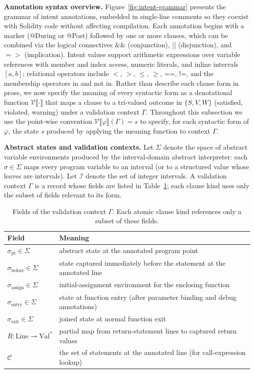 \documentclass[pdflatex,sn-basic]{sn-jnl}%
\theoremstyle{thmstyleone}%
\theoremstyle{thmstyletwo}%
\theoremstyle{thmstylethree}%
\begin{document}
\smallskip
\noindent\textbf{Annotation syntax overview.}
Figure~\ref{fig:intent-grammar} presents the grammar of intent annotations, embedded in single-line comments so they coexist with Solidity code without affecting compilation.
Each annotation begins with a marker (@During or @Post) followed by one or more clauses, which can be combined via the logical connectives \&\& (conjunction), || (disjunction), and ${=}{>}$ (implication).
Intent values support arithmetic expressions over variable references with member and index access, numeric literals, and inline intervals $[a, b]$; relational operators include $<$, $>$, $\leq$, $\geq$, ==, !=, and the membership operators in and not in.
Rather than describe each clause form in prose, we now specify the meaning of every syntactic form as a denotational function $\mathcal{V}\llbracket\cdot\rrbracket$ that maps a clause to a tri-valued outcome in $\{S, V, W\}$ (satisfied, violated, warning) under a validation context $\Gamma$.
Throughout this subsection we use the point-wise convention $\mathcal{V}\llbracket \varphi \rrbracket(\Gamma) = s$ to specify, for each syntactic form of $\varphi$, the state $s$ produced by applying the meaning function to context $\Gamma$.

\smallskip
\noindent\textbf{Abstract states and validation contexts.}
Let $\Sigma$ denote the space of abstract variable environments produced by the interval-domain abstract interpreter: each $\sigma \in \Sigma$ maps every program variable to an interval (or to a structured value whose leaves are intervals).
Let $\mathcal{I}$ denote the set of integer intervals.
A validation context $\Gamma$ is a record whose fields are listed in Table~\ref{tab:validation-context}; each clause kind uses only the subset of fields relevant to its form.

\begin{table}[t]
\centering
\caption{Fields of the validation context $\Gamma$. Each atomic clause kind references only a subset of these fields.}
\label{tab:validation-context}
\small
\begin{tabular*}{\linewidth}{@{\extracolsep{\fill}} l l @{}}
\toprule
Field & Meaning \\
\midrule
$\sigma_{\text{pt}} \in \Sigma$ & abstract state at the annotated program point \\
$\sigma_{\text{before}} \in \Sigma$ & state captured immediately before the statement at the annotated line \\
$\sigma_{\text{assign}} \in \Sigma$ & initial-assignment environment for the enclosing function \\
$\sigma_{\text{entry}} \in \Sigma$ & state at function entry (after parameter binding and debug annotations) \\
$\sigma_{\text{exit}} \in \Sigma$ & joined state at normal function exit \\
$R : \text{Line} \rightharpoonup \text{Val}^*$ & partial map from return-statement lines to captured return values \\
$\mathcal{C}$ & the set of statements at the annotated line (for call-expression lookup) \\
\bottomrule
\end{tabular*}
\end{table}
\end{document}
